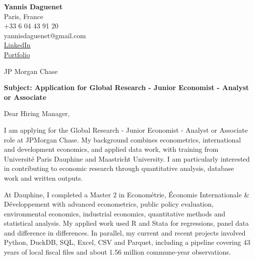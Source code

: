 \documentclass[11pt,a4paper]{article}
\begin{document}
\begin{flushleft}
\textbf{Yannis Daguenet}\\
Paris, France\\
+33 6 04 43 91 20\\
yannisdaguenet@gmail.com\\
\href{https://linkedin.com/in/yannis-daguenet}{LinkedIn}\\\href{https://daguenetyannisportfolio.netlify.app/}{Portfolio}\\\end{flushleft}

\vspace{0.25cm}


\vspace{0.15cm}

\begin{flushleft}
JP Morgan Chase\\\end{flushleft}

\vspace{0.20cm}

\textbf{Subject: Application for Global Research - Junior Economist - Analyst or Associate}

\vspace{0.25cm}

Dear Hiring Manager,

\vspace{0.18cm}

I am applying for the Global Research - Junior Economist - Analyst or Associate role at JPMorgan Chase. My background combines econometrics, international and development economics, and applied data work, with training from Université Paris Dauphine and Maastricht University. I am particularly interested in contributing to economic research through quantitative analysis, database work and written outputs.

\vspace{0.18cm}
At Dauphine, I completed a Master 2 in Econométrie, Économie Internationale \& Développement with advanced econometrics, public policy evaluation, environmental economics, industrial economics, quantitative methods and statistical analysis. My applied work used R and Stata for regressions, panel data and difference in differences. In parallel, my current and recent projects involved Python, DuckDB, SQL, Excel, CSV and Parquet, including a pipeline covering 43 years of local fiscal files and about 1.56 million commune-year observations.
\end{document}
